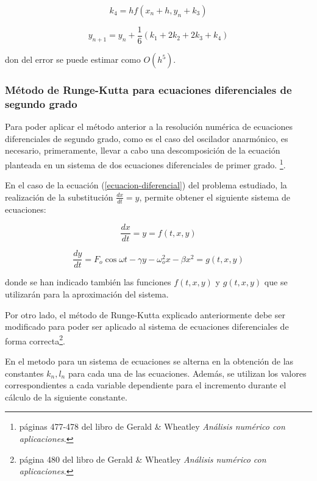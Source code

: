 \documentclass[11pt]{article}
\begin{document}
\begin{equation}
	k_4 = hf(x_n + h, y_n + k_3)
\end{equation} 

\begin{equation}
	y_{n+1} = y_{n} + \frac{1}{6}(k_1 + 2k_2 + 2k_3 + k_4)
\end{equation}

don del error se puede estimar como $O(h^5)$.

\subsubsection{Método de Runge-Kutta para ecuaciones diferenciales de segundo
grado}
\label{segundo_grado}
Para poder aplicar el método anterior a la resolución numérica de ecuaciones
diferenciales de segundo grado, como es el caso del oscilador anarmónico, es
necesario, primeramente, llevar a cabo una descomposición de la ecuación
planteada en un sistema de dos ecuaciones diferenciales de primer grado.
\footnote{páginas 477-478 del libro de Gerald \& Wheatley \textit{Análisis
numérico con aplicaciones}.}.

En el caso de la ecuación (\ref{ecuacion-diferencial}) del problema estudiado,
la realización de la substitución $\frac{dx}{dt} = y$, permite obtener el
siguiente sistema de ecuaciones:

\begin{equation}
	\frac{dx}{dt} = y = f(t, x, y)
\end{equation}

\begin{equation}
	\frac{dy}{dt} = F_{o}\cos{\omega{}t} -\gamma{}y - \omega_{o}^2x
	- \beta{}x^2 = g(t, x, y) 	
\end{equation}

donde se han indicado también las funciones $f(t, x, y)$ y $g(t, x, y)$ que se
utilizarán para la aproximación del sistema.

Por otro lado, el método de Runge-Kutta explicado anteriormente debe ser
modificado para poder ser aplicado al sistema de ecuaciones diferenciales de
forma correcta\footnote{página 480 del libro de Gerald \& Wheatley
\textit{Análisis numérico con aplicaciones}.}. 

En el metodo para un sistema de ecuaciones se alterna en la obtención de las
constantes $k_n, l_n$ para cada una de las ecuaciones. Además, se utilizan los
valores correspondientes a cada variable dependiente para el incremento durante
el cálculo de la siguiente constante. 
\end{document}
